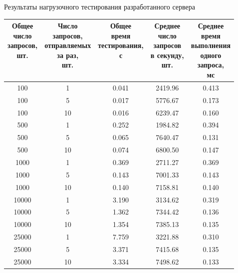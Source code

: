 \begin{center}
	\begin{threeparttable}
		\captionsetup{justification=raggedright,singlelinecheck=off}
		\caption{\label{tbl_myserv}Результаты нагрузочного тестирования разработанного сервера}
		\centering
		\begin{tabular}{|c|c|c|c|c|}
			\hline
			\specialcell{Общее\\число\\запросов,\\шт.} & \specialcell{Число\\запросов,\\отправляемых\\за раз,\\шт.} & \specialcell{Общее\\время\\тестирования,\\с} & \specialcell{Среднее\\число\\запросов\\в секунду,\\шт.} & \specialcell{Среднее\\время\\выполнения\\одного\\запроса,\\мс} \\
			\hline
			100 & 1 & 0.041 & 2419.96 & 0.413 \\
			\hline
			100 & 5 & 0.017 & 5776.67 & 0.173 \\
			\hline
			100 & 10 & 0.016 & 6239.47 & 0.160 \\
			\hline
			500 & 1 & 0.252 & 1984.82 & 0.394 \\
			\hline
			500 & 5 & 0.065 & 7640.47 & 0.131 \\
			\hline
			500 & 10 & 0.074 & 6800.50 & 0.147 \\
			\hline
			1000 & 1 & 0.369 & 2711.27 & 0.369 \\
			\hline
			1000 & 5 & 0.143 & 7001.33 & 0.143 \\
			\hline
			1000 & 10 & 0.140 & 7158.81 & 0.140 \\
			\hline
			10000 & 1 & 3.190 & 3134.62 & 0.319 \\
			\hline
			10000 & 5 & 1.362 & 7344.42 & 0.136 \\
			\hline
			10000 & 10 & 1.354 & 7385.13 & 0.135 \\
			\hline
			25000 & 1 & 7.759 & 3221.88 & 0.310 \\
			\hline
			25000 & 5 & 3.371 & 7415.68 & 0.135 \\
			\hline
			25000 & 10 & 3.334 & 7498.62 & 0.133 \\
			\hline
		\end{tabular}
	\end{threeparttable}
\end{center}

